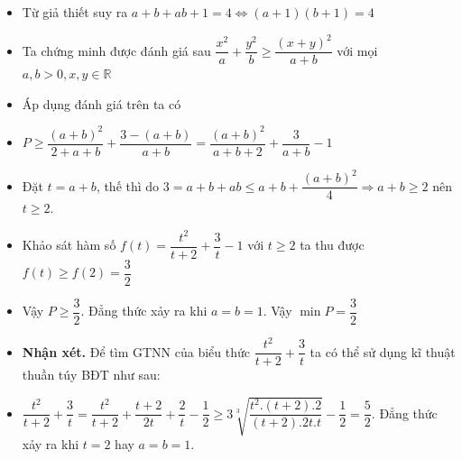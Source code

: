 \lgi 
\begin{itemize}[label=,leftmargin=*]
\item Từ giả thiết suy ra $a+b+ab+1=4 \Leftrightarrow (a+1)(b+1)=4$
\item Ta chứng minh được đánh giá sau $\dfrac{x^2}{a}+\dfrac{y^2}{b}\ge \dfrac{(x+y)^2}{a+b}$ với mọi $a,b>0, x,y \in \mathbb{R}$
\item Áp dụng đánh giá trên ta có
\item $P\ge \dfrac{(a+b)^2}{2+a+b}+\dfrac{3-(a+b)}{a+b}=\dfrac{(a+b)^2}{a+b+2}+\dfrac{3}{a+b}-1$
\item Đặt $t=a+b$, thế thì do $3=a+b+ab\le a+b+\dfrac{(a+b)^2}{4}\Rightarrow a+b\ge 2$ nên $t\ge 2$.
\item Khảo sát hàm số $f(t)=\dfrac{t^2}{t+2}+\dfrac{3}{t}-1$ với $t\ge 2$ ta thu được $f(t)\ge f(2)=\dfrac{3}{2}$
\item Vậy $P\ge \dfrac{3}{2}$. Đẳng thức xảy ra khi $a=b=1$. Vậy $\min P=\dfrac{3}{2}$
\item \textbf{Nhận xét.} Để tìm GTNN của biểu thức $\dfrac{t^2}{t+2}+\dfrac{3}{t}$ ta có thể sử dụng kĩ thuật thuần túy BĐT như sau:
\item $\dfrac{t^2}{t+2}+\dfrac{3}{t}=\dfrac{t^2}{t+2}+\dfrac{t+2}{2t}+\dfrac{2}{t}-\dfrac{1}{2}\ge 3\sqrt[3]{\dfrac{t^2.(t+2).2}{(t+2).2t.t}}-\dfrac{1}{2}=\dfrac{5}{2}$. Đẳng thức xảy ra khi $t=2$ hay $a=b=1$.
\end{itemize}

